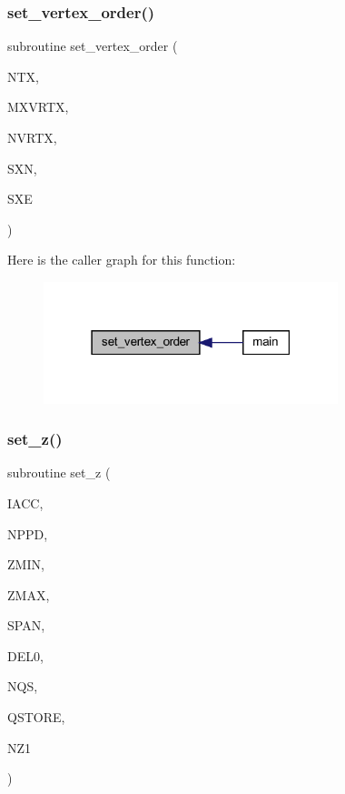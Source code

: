 \subsubsection{\texorpdfstring{set\+\_\+vertex\+\_\+order()}{set\_vertex\_order()}}
{\footnotesize\ttfamily subroutine set\+\_\+vertex\+\_\+order (\begin{DoxyParamCaption}\item[{integer}]{N\+TX,  }\item[{integer}]{M\+X\+V\+R\+TX,  }\item[{integer, dimension(ntx)}]{N\+V\+R\+TX,  }\item[{real, dimension (mxvrtx,ntx)}]{S\+XN,  }\item[{real, dimension (mxvrtx,ntx)}]{S\+XE }\end{DoxyParamCaption})}

Here is the caller graph for this function\+:\nopagebreak
\begin{figure}[H]
\begin{center}
\leavevmode
\includegraphics[width=243pt]{Leroi_8f90_a0cb3e794e8c12de92dbc3e157d7991c4_icgraph}
\end{center}
\end{figure}
\mbox{\label{Leroi_8f90_aebaab3e30630bc52f3b79ccbc924f89c}} 
\subsubsection{\texorpdfstring{set\+\_\+z()}{set\_z()}}
{\footnotesize\ttfamily subroutine set\+\_\+z (\begin{DoxyParamCaption}\item[{integer}]{I\+A\+CC,  }\item[{integer}]{N\+P\+PD,  }\item[{real}]{Z\+M\+IN,  }\item[{real}]{Z\+M\+AX,  }\item[{real}]{S\+P\+AN,  }\item[{real}]{D\+E\+L0,  }\item[{integer}]{N\+QS,  }\item[{real, dimension(nqs)}]{Q\+S\+T\+O\+RE,  }\item[{integer}]{N\+Z1 }\end{DoxyParamCaption})}

